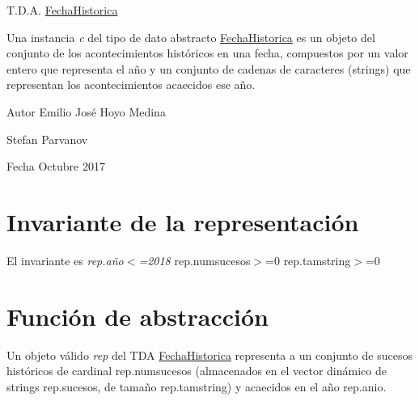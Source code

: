 T.\+D.\+A. \hyperlink{classFechaHistorica}{Fecha\+Historica}

Una instancia {\itshape c} del tipo de dato abstracto {\ttfamily \hyperlink{classFechaHistorica}{Fecha\+Historica}} es un objeto del conjunto de los acontecimientos históricos en una fecha, compuestos por un valor entero que representa el año y un conjunto de cadenas de caracteres (strings) que representan los acontecimientos acaecidos ese año. \begin{DoxyAuthor}{Autor}
Emilio José Hoyo Medina 

Stefan Parvanov 
\end{DoxyAuthor}
\begin{DoxyDate}{Fecha}
Octubre 2017
\end{DoxyDate}
\hypertarget{repBConjunto_invConjunto}{}\section{Invariante de la representación}\label{repBConjunto_invConjunto}
El invariante es {\itshape rep.\+año$<$=2018} rep.\+numsucesos$>$=0 rep.\+tamstring$>$=0\hypertarget{repBConjunto_faConjunto}{}\section{Función de abstracción}\label{repBConjunto_faConjunto}
Un objeto válido {\itshape rep} del T\+DA \hyperlink{classFechaHistorica}{Fecha\+Historica} representa a un conjunto de sucesos históricos de cardinal rep.\+numsucesos (almacenados en el vector dinámico de strings rep.\+sucesos, de tamaño rep.\+tamstring) y acaecidos en el año rep.\+anio. 